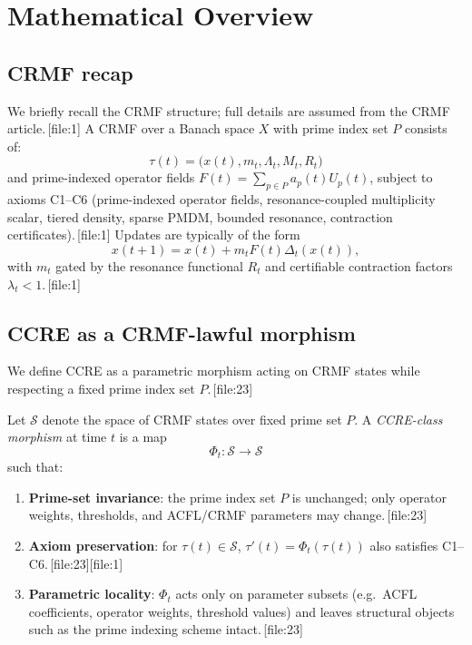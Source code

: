 \documentclass[11pt]{article}
\begin{document}
\section{Mathematical Overview}

\subsection{CRMF recap}

We briefly recall the CRMF structure; full details are assumed from the CRMF article.\,[file:1]
A CRMF over a Banach space $X$ with prime index set $P$ consists of:
\[
  \tau(t) = \bigl(x(t), m_t, \Lambda_t, M_t, R_t\bigr)
\]
and prime-indexed operator fields $F(t) = \sum_{p\in P} a_p(t)U_p(t)$, subject to axioms C1--C6 (prime-indexed operator fields, resonance-coupled multiplicity scalar, tiered density, sparse PMDM, bounded resonance, contraction certificates).\,[file:1]
Updates are typically of the form
\[
  x(t+1) = x(t) + m_t F(t)\Delta_t(x(t)),
\]
with $m_t$ gated by the resonance functional $R_t$ and certifiable contraction factors $\lambda_t<1$.\,[file:1]

\subsection{CCRE as a CRMF-lawful morphism}

We define CCRE as a parametric morphism acting on CRMF states while respecting a fixed prime index set $P$.\,[file:23]

\begin{definition}
Let $\mathcal{S}$ denote the space of CRMF states over fixed prime set $P$.
A \emph{CCRE-class morphism} at time $t$ is a map
\[
  \Phi_t : \mathcal{S} \to \mathcal{S}
\]
such that:
\begin{enumerate}[leftmargin=1.5em]
  \item \textbf{Prime-set invariance}: the prime index set $P$ is unchanged; only operator weights, thresholds, and ACFL/CRMF parameters may change.\,[file:23]
  \item \textbf{Axiom preservation}: for $\tau(t) \in \mathcal{S}$, $\tau'(t) = \Phi_t(\tau(t))$ also satisfies C1--C6.\,[file:23][file:1]
  \item \textbf{Parametric locality}: $\Phi_t$ acts only on parameter subsets (e.g.\ ACFL coefficients, operator weights, threshold values) and leaves structural objects such as the prime indexing scheme intact.\,[file:23]
\end{enumerate}
\end{definition}
\end{document}
